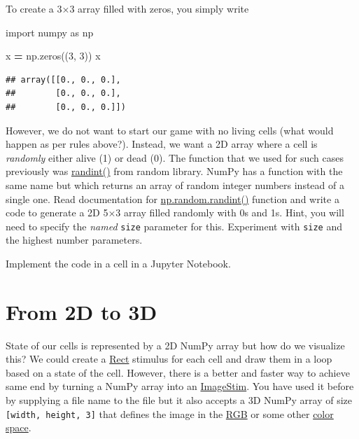 \documentclass[
]{book}
\newenvironment{Shaded}{\begin{snugshade}}{\end{snugshade}}
\newcommand{\DecValTok}[1]{\textcolor[rgb]{0.00,0.00,0.81}{#1}}
\newcommand{\ImportTok}[1]{#1}
\newcommand{\NormalTok}[1]{#1}
\newcommand{\OperatorTok}[1]{\textcolor[rgb]{0.81,0.36,0.00}{\textbf{#1}}}
\begin{document}
To create a 3×3 array filled with zeros, you simply write

\begin{Shaded}
\begin{Highlighting}[]
\ImportTok{import}\NormalTok{ numpy }\ImportTok{as}\NormalTok{ np}

\NormalTok{x }\OperatorTok{=}\NormalTok{ np.zeros((}\DecValTok{3}\NormalTok{, }\DecValTok{3}\NormalTok{))}
\NormalTok{x}
\end{Highlighting}
\end{Shaded}

\begin{verbatim}
## array([[0., 0., 0.],
##        [0., 0., 0.],
##        [0., 0., 0.]])
\end{verbatim}

However, we do not want to start our game with no living cells (what would happen as per rules above?). Instead, we want a 2D array where a cell is \emph{randomly} either alive (1) or dead (0). The function that we used for such cases previously was \href{https://docs.python.org/3/library/random.html\#random.randint}{randint()} from random library. NumPy has a function with the same name but which returns an array of random integer numbers instead of a single one. Read documentation for \href{https://numpy.org/doc/stable/reference/random/generated/numpy.random.randint.html}{np.random.randint()} function and write a code to generate a 2D 5×3 array filled randomly with 0s and 1s. Hint, you will need to specify the \emph{named} \texttt{size} parameter for this. Experiment with \texttt{size} and the highest number parameters.

Implement the code in a cell in a Jupyter Notebook.

\hypertarget{from-2d-to-3d}{%
\section{From 2D to 3D}\label{from-2d-to-3d}}

State of our cells is represented by a 2D NumPy array but how do we visualize this? We could create a \href{https://psychopy.org/api/visual/rect.html\#psychopy.visual.rect.Rect}{Rect} stimulus for each cell and draw them in a loop based on a state of the cell. However, there is a better and faster way to achieve same end by turning a NumPy array into an \href{https://psychopy.org/api/visual/imagestim.html}{ImageStim}. You have used it before by supplying a file name to the file but it also accepts a 3D NumPy array of size \texttt{{[}width,\ height,\ 3{]}} that defines the image in the \href{https://psychopy.org/general/colours.html\#rgb-color-space}{RGB} or some other \href{https://psychopy.org/general/colours.html}{color space}.
\end{document}
